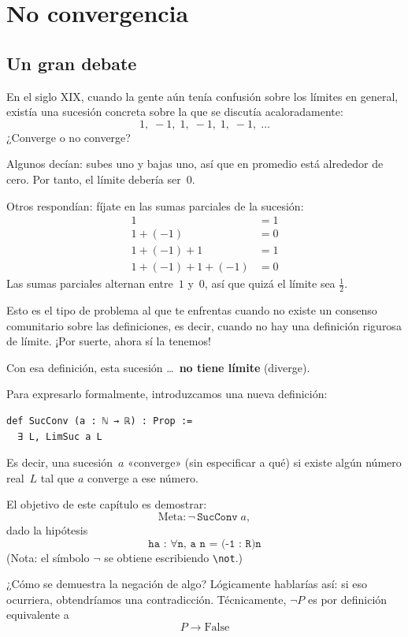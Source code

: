 \chapter{No convergencia}

\section{Un gran debate}

En el siglo XIX, cuando la gente aún tenía confusión sobre los límites en general,
existía una sucesión concreta sobre la que se discutía acaloradamente:
\[
  1,\; -1,\; 1,\; -1,\; 1,\; -1,\; \ldots
\]
¿Converge o no converge?

Algunos decían: subes uno y bajas uno, así que en promedio está alrededor de
cero. Por tanto, el límite debería ser~$0$.

Otros respondían: fíjate en las sumas parciales de la sucesión:
\begin{align*}
  1 &= 1 \\
  1 + (-1) &= 0 \\
  1 + (-1) + 1 &= 1 \\
  1 + (-1) + 1 + (-1) &= 0
\end{align*}
Las sumas parciales alternan entre~$1$ y~$0$, así que quizá el límite sea
$\tfrac{1}{2}$.

Esto es el tipo de problema al que te enfrentas cuando no existe un consenso
comunitario sobre las definiciones, es decir, cuando no hay una definición
rigurosa de límite. ¡Por suerte, ahora sí la tenemos!

Con esa definición, esta sucesión \ldots\ \textbf{no tiene límite} (diverge).

Para expresarlo formalmente, introduzcamos una nueva definición:

\begin{verbatim}
def SucConv (a : ℕ → ℝ) : Prop :=
  ∃ L, LimSuc a L
\end{verbatim}

Es decir, una sucesión~$a$ «converge» (sin especificar a qué) si existe algún
número real~$L$ tal que $a$ converge a ese número.

El objetivo de este capítulo es demostrar:
\[
  \text{Meta}: \neg\,\texttt{SucConv}\;a,
\]
dado la hipótesis
\[
  \texttt{ha : ∀n, a n = (-1 : R)\^{}n}
\]
(Nota: el símbolo $\neg$ se obtiene escribiendo \verb|\not|.)

¿Cómo se demuestra la negación de algo? Lógicamente hablarías así: si eso
ocurriera, obtendríamos una contradicción. Técnicamente, $\neg P$ es
por definición equivalente a \[P \to \text{False}\]

